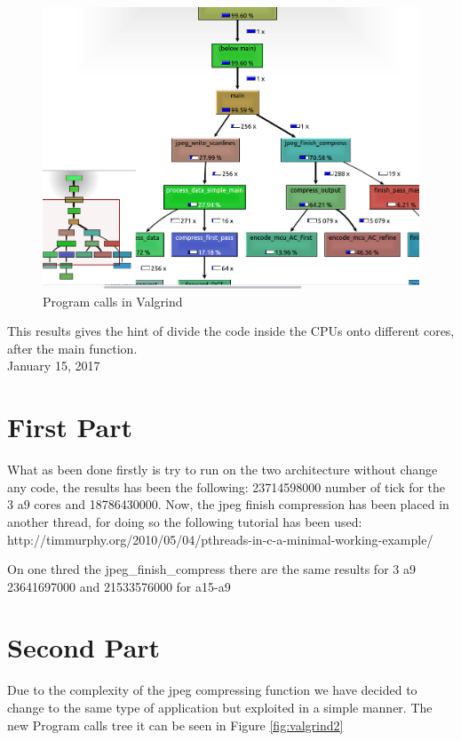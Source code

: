\documentclass[journal]{IEEEtran}
\begin{document}
\begin{figure}[!h]
	\includegraphics[width=\linewidth]{valgrind}
	\caption{Program calls in Valgrind}
	\label{fig:valgrind}
\end{figure}

This results gives the hint of divide the code inside the CPUs onto different cores, after the main function.\\
 
\hfill January 15, 2017

\section{First Part}

What as been done firstly is try to run on the two architecture without change any code, the results has been the following:
23714598000 number of tick for the 3 a9 cores and 18786430000. 
Now, the jpeg finish compression has been placed in another thread, for doing so the following tutorial has been used: http://timmurphy.org/2010/05/04/pthreads-in-c-a-minimal-working-example/

On one thred the jpeg\_finish\_compress there are the same results for 3 a9 23641697000 and 21533576000 for a15-a9



\section{Second Part}
Due to the complexity of the jpeg compressing function we have decided to change to the same type of application but exploited in a simple manner. The new Program calls tree it can be seen in Figure \ref{fig:valgrind2}
\end{document}
